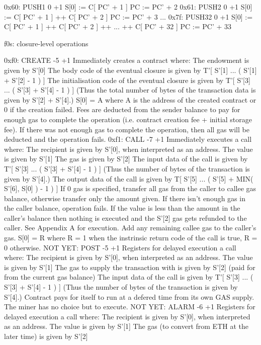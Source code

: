 \documentclass[9pt,oneside]{amsart}
\begin{document}
\begin{multicols}{2}
0x60: PUSH1 0 +1
S[0] := C[ PC' + 1 ]
PC := PC' + 2
0x61: PUSH2 0 +1
S[0] := C[ PC' + 1 ] ++ C[ PC' + 2 ]
PC := PC' + 3
...
0x7f: PUSH32 0 +1
S[0] := C[ PC' + 1 ] ++ C[ PC' + 2 ] ++ ... ++ C[ PC' + 32 ]
PC := PC' + 33

f0s: closure-level operations

0xf0: CREATE -5 +1
Immediately creates a contract where:
The endowment is given by S'[0]
The body code of the eventual closure is given by T'[ S'[1] ... ( S'[1] + S'[2] - 1 ) ]
The initialisation code of the eventual closure is given by T'[ S'[3] ... ( S'[3] + S'[4] - 1 ) ]
(Thus the total number of bytes of the transaction data is given by S'[2] + S'[4].)
S[0] = A
where A is the address of the created contract or 0 if the creation failed.
Fees are deducted from the sender balance to pay for enough gas to complete the operation (i.e. contract creation fee + initial storage fee). If there was not enough gas to complete the operation, then all gas will be deducted and the operation fails.
0xf1: CALL -7 +1
Immediately executes a call where:
The recipient is given by S'[0], when interpreted as an address.
The value is given by S'[1]
The gas is given by S'[2]
The input data of the call is given by T'[ S'[3] ... ( S'[3] + S'[4] - 1 ) ]
(Thus the number of bytes of the transaction is given by S'[4].)
The output data of the call is given by T[ S'[5] ... ( S'[5] + MIN( S'[6], S[0] ) - 1 ) ]
If 0 gas is specified, transfer all gas from the caller to callee gas balance, otherwise transfer only the amount given. If there isn't enough gas in the caller balance, operation fails.
If the value is less than the amount in the caller's balance then nothing is executed and the S'[2] gas gets refunded to the caller.
See Appendix A for execution.
Add any remaining callee gas to the caller's gas.
S[0] = R
where R = 1 when the instrinsic return code of the call is true, R = 0 otherwise.
NOT YET: POST -5 +1
Registers for delayed execution a call where:
The recipient is given by S'[0], when interpreted as an address.
The value is given by S'[1]
The gas to supply the transaction with is given by S'[2] (paid for from the current gas balance)
The input data of the call is given by T'[ S'[3] ... ( S'[3] + S'[4] - 1 ) ]
(Thus the number of bytes of the transaction is given by S'[4].)
Contract pays for itself to run at a defered time from its own GAS supply. The miner has no choice but to execute.
NOT YET: ALARM -6 +1
Registers for delayed execution a call where:
The recipient is given by S'[0], when interpreted as an address.
The value is given by S'[1]
The gas (to convert from ETH at the later time) is given by S'[2]

\end{multicols}
\end{document}
